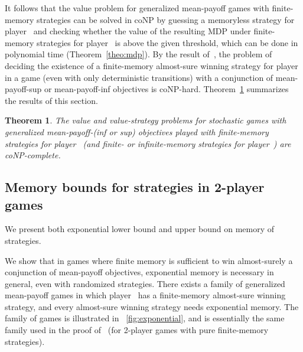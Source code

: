\documentclass{article}
\newtheorem{theorem}{Theorem}
\newcommand{\half}{}
\begin{document}
It follows that the value problem for generalized mean-payoff games
with finite-memory strategies can be solved in coNP by guessing a memoryless
strategy for player~ and checking whether the value of the resulting
MDP under finite-memory strategies for player~ is above the given threshold, 
which can be done in polynomial time (Theorem~\ref{theo:mdp}).
By the result of~\cite[Lemma~5, Lemma~6]{VCDHRR15}, the problem of deciding
the existence of a finite-memory almost-sure winning strategy for player~ in a game 
(even with only deterministic transitions) with a conjunction of mean-payoff-sup 
or mean-payoff-inf objectives is coNP-hard. 
Theorem~\ref{theo:finite-coNP-complete} summarizes the results of this section.



\begin{theorem}\label{theo:finite-coNP-complete}
The value and value-strategy problems for stochastic games
with generalized mean-payoff-(inf or sup) objectives 
played with finite-memory strategies for player~ 
(and finite- or infinite-memory strategies for player~) 
are coNP-complete.
\end{theorem}




\subsection{Memory bounds for strategies in 2\half-player games}\label{sec:membou}
We present both exponential lower bound and upper bound on memory of strategies.

\smallskip{}
We show that in games where finite memory is sufficient to win almost-surely 
a conjunction of mean-payoff objectives, exponential memory is necessary in general,
even with randomized strategies. There exists a 
family of generalized mean-payoff games in which player~ has a finite-memory almost-sure winning 
strategy, and every almost-sure winning strategy needs exponential memory.
The family of games is illustrated in \figurename~\ref{fig:exponential},
and is essentially the same family used in the proof of~\cite[Lemma 8]{CRR14}
(for 2-player games with pure finite-memory strategies). 
\end{document}
